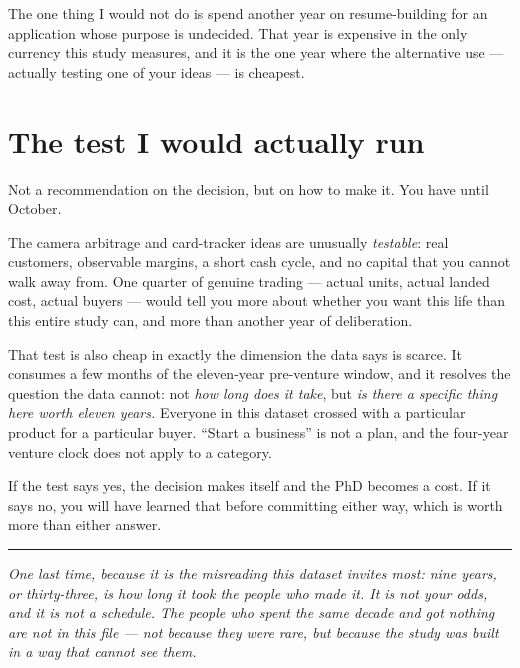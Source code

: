 \documentclass[11pt]{article}
\begin{document}
The one thing I would not do is spend another year on resume-building for an
application whose purpose is undecided. That year is expensive in the only
currency this study measures, and it is the one year where the alternative use
--- actually testing one of your ideas --- is cheapest.

\section{The test I would actually run}

Not a recommendation on the decision, but on how to make it. You have until
October.

The camera arbitrage and card-tracker ideas are unusually \emph{testable}: real
customers, observable margins, a short cash cycle, and no capital that you
cannot walk away from. One quarter of genuine trading --- actual units, actual
landed cost, actual buyers --- would tell you more about whether you want this
life than this entire study can, and more than another year of deliberation.

That test is also cheap in exactly the dimension the data says is scarce. It
consumes a few months of the eleven-year pre-venture window, and it resolves the
question the data cannot: not \emph{how long does it take}, but \emph{is there a
specific thing here worth eleven years.} Everyone in this dataset crossed with a
particular product for a particular buyer. ``Start a business'' is not a plan,
and the four-year venture clock does not apply to a category.

If the test says yes, the decision makes itself and the PhD becomes a cost. If
it says no, you will have learned that before committing either way, which is
worth more than either answer.

\vspace{1em}
\hrule
\vspace{0.6em}

\emph{\small One last time, because it is the misreading this dataset invites
most: nine years, or thirty-three, is how long it took the people who made it.
It is not your odds, and it is not a schedule. The people who spent the same
decade and got nothing are not in this file --- not because they were rare, but
because the study was built in a way that cannot see them.}
\end{document}
